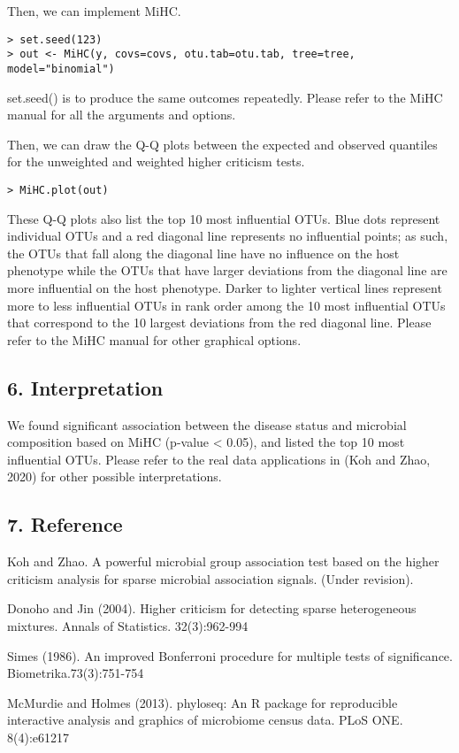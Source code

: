 \documentclass[
]{article}
\begin{document}
Then, we can implement MiHC.

\begin{verbatim}
> set.seed(123)
> out <- MiHC(y, covs=covs, otu.tab=otu.tab, tree=tree, model="binomial")
\end{verbatim}

set.seed() is to produce the same outcomes repeatedly. Please refer to
the MiHC manual for all the arguments and options.

Then, we can draw the Q-Q plots between the expected and observed
quantiles for the unweighted and weighted higher criticism tests.

\begin{verbatim}
> MiHC.plot(out)
\end{verbatim}

These Q-Q plots also list the top 10 most influential OTUs. Blue dots
represent individual OTUs and a red diagonal line represents no
influential points; as such, the OTUs that fall along the diagonal line
have no influence on the host phenotype while the OTUs that have larger
deviations from the diagonal line are more influential on the host
phenotype. Darker to lighter vertical lines represent more to less
influential OTUs in rank order among the 10 most influential OTUs that
correspond to the 10 largest deviations from the red diagonal line.
Please refer to the MiHC manual for other graphical options.

\hypertarget{interpretation}{%
\subsection{6. Interpretation}\label{interpretation}}

We found significant association between the disease status and
microbial composition based on MiHC (p-value \textless{} 0.05), and
listed the top 10 most influential OTUs. Please refer to the real data
applications in (Koh and Zhao, 2020) for other possible interpretations.

\hypertarget{reference}{%
\subsection{7. Reference}\label{reference}}

Koh and Zhao. A powerful microbial group association test based on the
higher criticism analysis for sparse microbial association signals.
(Under revision).

Donoho and Jin (2004). Higher criticism for detecting sparse
heterogeneous mixtures. Annals of Statistics. 32(3):962-994

Simes (1986). An improved Bonferroni procedure for multiple tests of
significance. Biometrika.73(3):751-754

McMurdie and Holmes (2013). phyloseq: An R package for reproducible
interactive analysis and graphics of microbiome census data. PLoS ONE.
8(4):e61217
\end{document}
